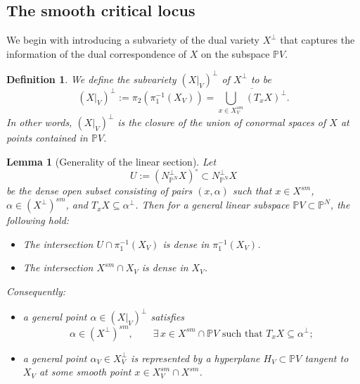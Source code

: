 \documentclass[12pt]{amsart}
\newtheorem{definition}[theorem]{Definition}
\newtheorem{lemma}[theorem]{Lemma}
\begin{document}
\subsection{The smooth critical locus}
We begin with introducing a subvariety of the dual variety $X^{\perp}$ that captures the information of the dual correspondence of $X$ on the subspace $\mathbb PV$.
\begin{definition}\normalfont\label{def_critlocus}
    We define the subvariety $(X|_V)^{\perp}$ of $X^{\perp}$ to be 
    $$(X|_V)^{\perp}:=\pi_2(\pi_1^{-1}(X_V))=\overline{\bigcup_{x\in X_V^{sm}}(T_xX)^{\perp}}.$$
    In other words, $(X|_V)^{\perp}$ is the closure of the union of conormal spaces of $X$ at points contained in $\mathbb PV$.
\end{definition}



\begin{lemma}[Generality of the linear section]\label{lemma_generalityV}
Let
\[
U:=(N_{\mathbb P^N}^{\perp}X)^\circ
\subset N_{\mathbb P^N}^{\perp}X
\]
be the dense open subset consisting of pairs $(x,\alpha)$ such that
$x\in X^{sm}$, $\alpha\in (X^\perp)^{sm}$, and $T_xX\subseteq \alpha^\perp$.
Then for a general linear subspace $\mathbb PV\subset \mathbb P^N$, the following hold:

\begin{itemize}
\item[(1)] The intersection
$U\cap \pi_1^{-1}(X_V)$
is dense in $\pi_1^{-1}(X_V)$.

\item[(2)] The intersection
$X^{sm}\cap X_V$
is dense in $X_V$.
\end{itemize}

Consequently:

\begin{itemize}
\item[(i)] a general point $\alpha\in (X|_V)^\perp$ satisfies
\[
\alpha\in (X^\perp)^{sm},
\qquad
\exists\, x\in X^{sm}\cap \mathbb PV
\text{ such that } T_xX\subseteq \alpha^\perp;
\]

\item[(ii)] a general point $\alpha_V\in X_V^\perp$ is represented by a hyperplane
$H_V\subset \mathbb PV$ tangent to $X_V$ at some smooth point 
$x\in X_V^{sm}\cap X^{sm}$.
\end{itemize}
\end{lemma}
\end{document}
